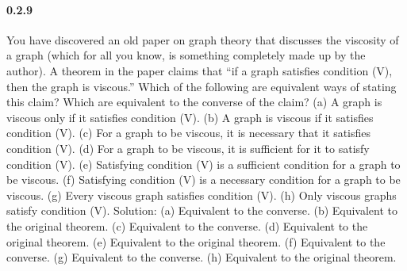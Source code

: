 \documentclass{article}
\begin{document}
\paragraph{0.2.9}
You have discovered an old paper on graph theory that discusses the
viscosity of a graph (which for all you know, is something completely
made up by the author). A theorem in the paper claims that “if a
graph satisfies condition (V), then the graph is viscous.” Which of
the following are equivalent ways of stating this claim? Which are
equivalent to the converse of the claim?\newline
(a) A graph is viscous only if it satisfies condition (V).\newline
(b) A graph is viscous if it satisfies condition (V).\newline
(c) For a graph to be viscous, it is necessary that it satisfies condition
(V).\newline
(d) For a graph to be viscous, it is sufficient for it to satisfy condition
(V).\newline
(e) Satisfying condition (V) is a sufficient condition for a graph to
be viscous.\newline
(f) Satisfying condition (V) is a necessary condition for a graph to
be viscous.\newline
(g) Every viscous graph satisfies condition (V).\newline
(h) Only viscous graphs satisfy condition (V).\newline
Solution:\newline
(a) Equivalent to the converse.\newline
(b) Equivalent to the original theorem.\newline
(c) Equivalent to the converse.\newline
(d) Equivalent to the original theorem.\newline
(e) Equivalent to the original theorem.\newline
(f) Equivalent to the converse.\newline
(g) Equivalent to the converse.\newline
(h) Equivalent to the original theorem.
\end{document}
